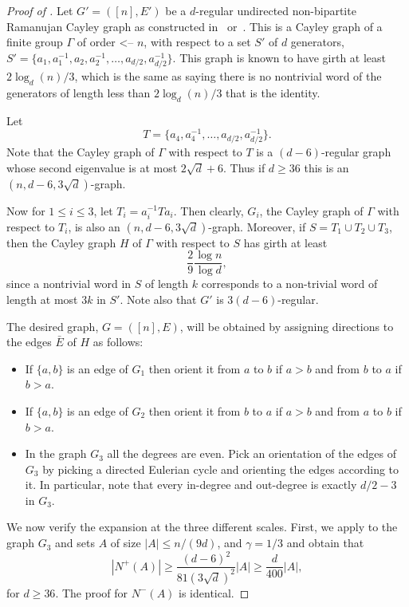 \documentclass{toc}
\begin{document}
\begin{proof}[Proof of ]
Let $G'=([n],E')$ be a $d$-regular 
undirected non-bipartite Ramanujan Cayley graph as constructed in~\cite{LPS} or~\cite{Ma}. 
%
This is a Cayley graph of a finite group $\Gamma$ of
%
order  <--
$n$, with respect to a set $S'$ of $d$ generators,
$S' = \{a_1, a_1^{-1}, a_2, a_2^{-1},\ldots, a_{d/2}, a_{d/2}^{-1}\}$. 
This graph is known to have girth at least $2 \log_d(n)/3 $, which is
the same as saying there is no nontrivial word of the generators of
length less than $2 \log_d(n)/3$ that is the identity. 

Let
\[
  T = \bigl\{a_4,a_4^{-1},\ldots,a_{d/2},a_{d/2}^{-1}\bigr\}.
\]
Note that the Cayley graph of $\Gamma$ with respect to $T$ is a
%
$(d-6)$-regular  %
graph whose second eigenvalue is at most $2 \sqrt{d} +6$.
Thus if $ d \geq 36$ this is an $(n,d-6,3 \sqrt{d})$-graph.

Now for $1 \leq i \leq 3$, let $T_i = a_i^{-1} T a_i$. 
Then clearly, $G_i$, the Cayley graph  of $\Gamma$ with respect to $T_i$,
is also an $(n,d-6,3 \sqrt{d})$-graph. Moreover,
if $S = T_1 \cup T_2 \cup T_3$, then the Cayley graph $H$ of 
$\Gamma$ with respect to $S$ has girth at least
\[
  \frac{2}{9} \frac{\log n}{\log d},
\]
since a nontrivial word in $S$ of length $k$ corresponds to a
non-trivial word of length at most $3 k$ in $S'$.  Note also that $G'$
is $3(d-6)$-regular.

The desired graph, $G=([n],E)$, will be obtained by assigning directions
to the edges $\bar{E}$ of $H$ as follows: 
%
%
\begin{itemize}
\item If $\{a,b\}$ is an edge of $G_1$ then orient it from $a$ to $b$ if $a > b$ and from $b$ to $a$ if $b > a$.
\item If $\{a,b\}$ is an edge of $G_2$ then orient it from $b$ to $a$ if $a > b$ and from $a$ to $b$ if $b > a$.
\item In the graph $G_3$ all the degrees are even. Pick an orientation
of the edges of 
$G_3$ by picking a directed Eulerian cycle and orienting the edges
according to it. In particular, note that every
in-degree and out-degree is exactly $d/2-3$ in $G_3$. 
\end{itemize} 

We now verify the expansion at the three different scales.
First, we apply  to the graph $G_3$ and
sets $A$ of size $|A| \leq n/(9d)$, 
%
%
%
 and $\gamma = 1/3$ and obtain that 
\[
|N^{+}(A)| \geq \frac{(d-6)^2}{81 (3 {\sqrt d})^2} |A| \geq \frac{d}{400} |A|,
\]
for $d \geq 36$. The proof for $N^{-}(A)$ is identical. 
 


\end{proof}
\end{document}
